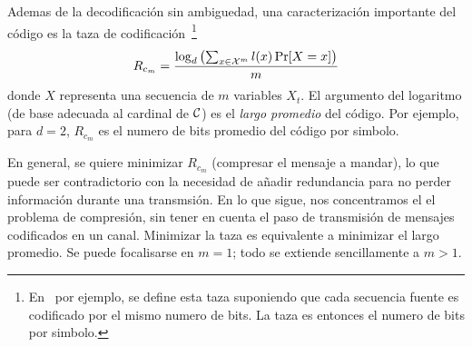 Ademas de  la decodificaci\'on sin ambiguedad,  una caracterizaci\'on importante
del c\'odigo es la taza de codificaci\'on~\footnote{En~\cite{Rio07} por ejemplo,
  se define esta taza suponiendo que  cada secuencia fuente es codificado por el
  mismo numero de bits. La taza es entonces el numero de bits por simbolo.}
%
\[
R_{c_m} = \frac{\log_d \left( \sum_{x \in \mathcal{X}^m} l(x) \Pr[X = x] \right)}{m}
\]
%
donde $X$  representa una  secuencia de $m$  variables $X_t$.  El  argumento del
logaritmo (de base adecuada al cardinal  de $\mathcal{C}$) es el {\it largo promedio} del
c\'odigo. Por ejemplo, para $d = 2$, $R_{c_m}$ es el numero de bits promedio del
c\'odigo por simbolo.

En general,  se quiere minimizar $R_{c_m}$  (compresar el mensaje  a mandar), lo
que puede  ser contradictorio con la  necesidad de a\~nadir  redundancia para no
perder informaci\'on durante una transmsi\'on. En lo que sigue, nos concentramos
el el problema de compresi\'on, sin  tener en cuenta el paso de transmisi\'on de
mensajes codificados en  un canal. Minimizar la taza  es equivalente a minimizar
el  largo  promedio.   Se  puede  focalisarse  en $m  =  1$;  todo  se  extiende
sencillamente a $m > 1$.

